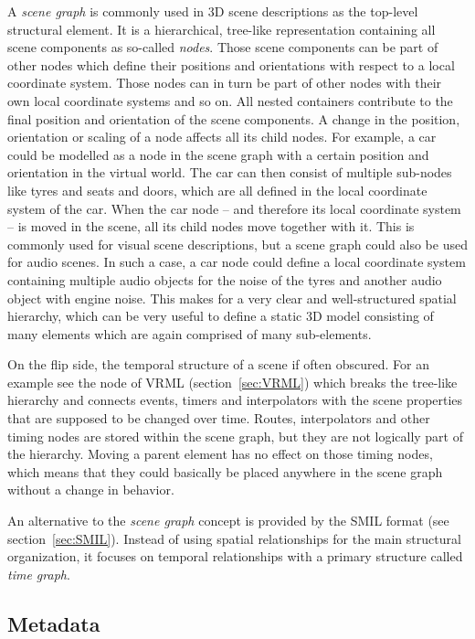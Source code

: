 A \emph{scene graph} is commonly used in 3D scene descriptions
as the top-level structural element.
It is a hierarchical, tree-like representation containing all scene components
as so-called \emph{nodes}.
Those scene components can be part of other nodes
which define their positions and orientations
with respect to a local coordinate system.
Those nodes can in turn be part of other nodes
with their own local coordinate systems and so on.
All nested containers contribute to the final position and orientation
of the scene components.
A change in the position, orientation or scaling of a node
affects all its child nodes.
For example, a car could be modelled as a node in the scene graph with a certain
position and orientation in the virtual world.
The car can then consist of multiple sub-nodes like tyres and seats and doors,
which are all defined in the local coordinate system of the car.
When the car node -- and therefore its local coordinate system --
is moved in the scene,
all its child nodes move together with it.
This is commonly used for visual scene descriptions,
but a scene graph could also be used for audio scenes.
In such a case, a car node could define a local coordinate system
containing multiple audio objects for the noise of the tyres
and another audio object with engine noise.
This makes for a very clear and well-structured spatial hierarchy,
which can be very useful to define a static 3D model
consisting of many elements which are again comprised of many sub-elements.

On the flip side, the temporal structure of a scene if often obscured.
For an example see the  node of VRML (section~\ref{sec:VRML})
which breaks the tree-like hierarchy
and connects events, timers and interpolators
with the scene properties that are supposed to be changed over time.
Routes, interpolators and other timing nodes are stored within the scene graph,
but they are not logically part of the hierarchy.
Moving a parent element has no effect on those timing nodes,
which means that they could basically be placed anywhere in the scene graph
without a change in behavior.

An alternative to the \emph{scene graph} concept is provided by the
SMIL format (see section~\ref{sec:SMIL}).
Instead of using spatial relationships for the main structural organization,
it focuses on temporal relationships
with a primary structure called \emph{time graph}.


\subsection{Metadata}

